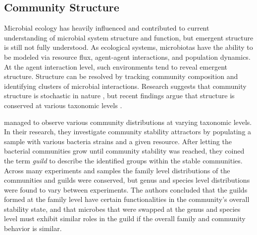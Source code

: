 \subsection{Community Structure}\label{intro-com-sturct}
Microbial ecology has heavily influenced and contributed to current understanding of microbial system structure and function, but emergent structure is still not fully understood. As ecological systems, microbiotas have the ability to be modeled via resource flux, agent-agent interactions, and population dynamics. At the agent interaction level, such environments tend to reveal emergent structure. Structure can be resolved by tracking community composition and identifying clusters of microbial interactions. Research suggests that community structure is stochastic in nature \citep{Robinson2010, Nemergut2013, Zhou2013}, but recent findings argue that structure is conserved at various taxonomic levels \citep{Goldford2018}. 

\citet{Goldford2018} managed to observe various community distributions at varying taxonomic levels. In their research, they investigate community stability attractors by populating a sample with various bacteria strains and a given resource. After letting the bacterial communities grow until community stability was reached, they coined the term \textit{guild} to describe the identified groups within the stable communities. Across many experiments and samples the family level distributions of the communities and guilds were conserved, but genus and species level distributions were found to vary between experiments. The authors concluded that the guilds formed at the family level have certain functionalities in the community's overall stability state, and that microbes that were swapped at the genus and species level must exhibit similar roles in the guild if the overall family and community behavior is similar.


